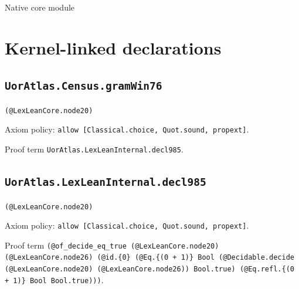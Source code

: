 \documentclass[11pt]{article}
\begin{document}
\begin{center}{\LARGE Native core module}\end{center}
\section*{Kernel-linked declarations}
\subsection*{\texttt{UorAtlas.Census.gramWin76}}
\noindent\texttt{(@LexLeanCore.node20)}\par
\noindent Axiom policy: \texttt{allow [Classical.choice, Quot.sound, propext]}.\par
\noindent Proof term \texttt{UorAtlas.LexLeanInternal.decl985}.\par
\subsection*{\texttt{UorAtlas.LexLeanInternal.decl985}}
\noindent\texttt{(@LexLeanCore.node20)}\par
\noindent Axiom policy: \texttt{allow [Classical.choice, Quot.sound, propext]}.\par
\noindent Proof term \texttt{(@of\_decide\_eq\_true (@LexLeanCore.node20) (@LexLeanCore.node26) (@id.\{0\} (@Eq.\{(0 + 1)\} Bool (@Decidable.decide (@LexLeanCore.node20) (@LexLeanCore.node26)) Bool.true) (@Eq.refl.\{(0 + 1)\} Bool Bool.true)))}.\par
\end{document}
